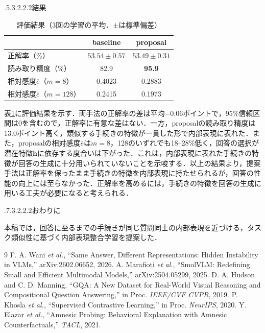 \documentclass[10pt,dvipdfmx]{jarticle}
\makeatletter
\renewcommand{\section}{\@startsection{section}{1}{\z@}%
  {.7\Cvs \@plus.3\Cvs \@minus.2\Cvs}{.2\Cvs \@plus.2\Cvs}{\normalfont\Large\bfseries}}
\renewcommand{\subsection}{\@startsection{subsection}{2}{\z@}%
  {.5\Cvs \@plus.3\Cvs \@minus.2\Cvs}{.2\Cvs \@plus.2\Cvs}{\normalfont\large\bfseries}}
\makeatother
\begin{document}
\subsection{結果}
\label{sec:results}

\begin{table}[t]
\caption{評価結果（3回の学習の平均．$\pm$は標準偏差）}
\label{tab:main}
\centering
\small
\begin{tabular}{l|c|c}\hline
 & baseline & \textbf{proposal} \\\hline
正解率（\%） & $53.54{\pm}0.57$ & $53.49{\pm}0.31$ \\
読み取り精度（\%） & 82.9 & \textbf{95.9} \\\hline
相対感度$\overline{e}$（$m = 8$） & 0.4023 & 0.2883 \\
相対感度$\overline{e}$（$m = 128$） & 0.2415 & 0.1973 \\\hline
\end{tabular}
\end{table}

表\ref{tab:main}に評価結果を示す．両手法の正解率の差は平均$-0.06$ポイントで，95\%信頼区間は0を含むので，正解率に有意な差はない．一方，proposalの読み取り精度は13.0ポイント高く，類似する手続きの特徴が一貫した形で内部表現に表れた．また，proposalの相対感度$\overline{e}$は$m = 8$，128のいずれでも18--28\%低く，回答の選択が潜在特徴$\boldsymbol{h}$に依存する度合いは下がった．これは，内部表現に表れた手続きの特徴が回答の生成に十分用いられていないことを示唆する．以上の結果より，提案手法は正解率を保ったまま手続きの特徴を内部表現に持たせられるが，回答の性能の向上には至らなかった．正解率を高めるには，手続きの特徴を回答の生成に用いる工夫が必要になると考えられる．

\section{おわりに}
\label{sec:conclusion}

本稿では，回答に至るまでの手続きが同じ質問同士の内部表現を近づける，タスク類似性に基づく内部表現整合学習を提案した．

{\footnotesize%
\begin{thebibliography}{9}
 F. A. Wani {\it et al.}, ``Same Answer, Different Representations: Hidden Instability in VLMs,'' arXiv:2602.06652, 2026.
 A. Marafioti {\it et al.}, ``SmolVLM: Redefining Small and Efficient Multimodal Models,'' arXiv:2504.05299, 2025.
 D. A. Hudson and C. D. Manning, ``GQA: A New Dataset for Real-World Visual Reasoning and Compositional Question Answering,'' in Proc. {\it IEEE/CVF CVPR}, 2019.
 P. Khosla {\it et al.}, ``Supervised Contrastive Learning,'' in Proc. {\it NeurIPS}, 2020.
 Y. Elazar {\it et al.}, ``Amnesic Probing: Behavioral Explanation with Amnesic Counterfactuals,'' {\it TACL}, 2021.
\end{thebibliography}
}

\end{document}
